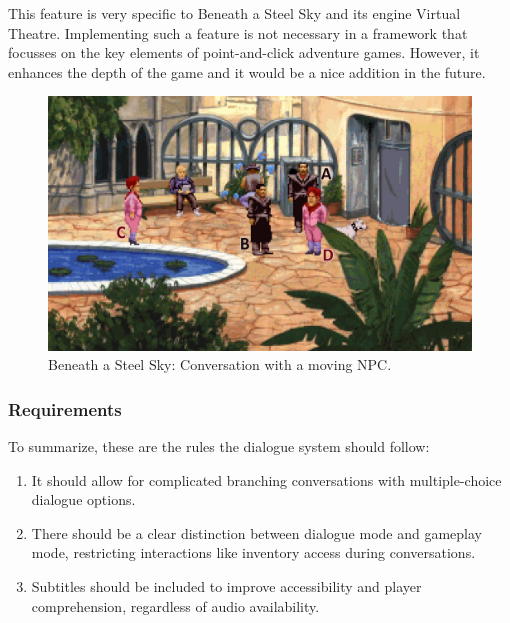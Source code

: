 \begin{notImplemented}
 \par
\vspace{3mm}
This feature is very specific to Beneath a Steel Sky and its engine Virtual Theatre. Implementing such a feature is not necessary in a framework that focusses on the key elements of point-and-click adventure games. However, it enhances the depth of the game and it would be a nice addition in the future. 
\end{notImplemented}

\begin{figure}[H]
\centering
\includegraphics[width=.8\linewidth]{img/C-BaSS2.png}
\caption{Beneath a Steel Sky: Conversation with a moving NPC.}
\label{fig:C-BaSS3}
\end{figure}

\subsubsection{Requirements}
To summarize, these are the rules the dialogue system should follow:

\begin{enumerate}[label=\color{teal}\textbf{R{\arabic*}},resume]
  \item \label{intro:req:multi_dialogue} It should allow for complicated branching conversations with multiple-choice dialogue options.
  \item \label{intro:req:modes} There should be a clear distinction between dialogue mode and gameplay mode, restricting interactions like inventory access during conversations.
  \item \label{intro:req:subs} Subtitles should be included to improve accessibility and player comprehension, regardless of audio availability.
\end{enumerate}


